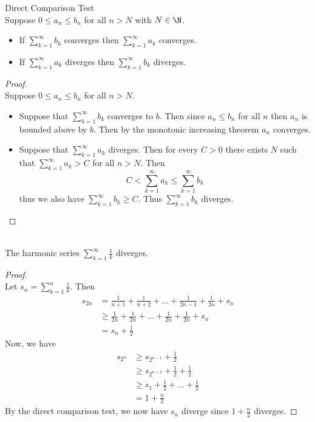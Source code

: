 \documentclass[a4paper]{article}
\begin{document}
\begin{thm}{Direct Comparison Test}{}\\ Suppose $0\leq a_n\leq b_n$ for all $n>N$ with $N\in\N$.
\begin{itemize}
\item If $\sum_{k=1}^\infty b_k$ converges then $\sum_{k=1}^\infty a_k$ converges. 
\item If $\sum_{k=1}^\infty a_k$ diverges then $\sum_{k=1}^\infty b_k$ diverges. 
\end{itemize}
\begin{proof}\\ Suppose $0\leq a_n\leq b_n$ for all $n>N$. 
\begin{itemize}
\item Suppose that $\sum_{k=1}^\infty b_k$ converges to $b$. Then since $a_n\leq b_n$ for all $n$ then $a_n$ is bounded above by $b$. Then by the monotonic increasing theorem $a_n$ converges. 
\item Suppose that $\sum_{k=1}^\infty a_k$ diverges. Then for every $C>0$ there exists $N$ such that $\sum_{k=1}^\infty a_k>C$ for all $n>N$. Then $$C<\sum_{k=1}^\infty a_k\leq\sum_{k=1}^\infty b_k$$ thus we also have $\sum_{k=1}^\infty b_k\geq C$. Thus $\sum_{k=1}^\infty b_k$ diverges. 
\end{itemize}
\end{proof}
\end{thm}

\begin{eg}{}{}\\ The harmonic series $\sum_{k=1}^\infty\frac{1}{k}$ diverges. 
\begin{proof}\\ Let $s_n=\sum_{k=1}^{n}\frac{1}{k}$. Then
\begin{align*}
s_{2n}&=\frac{1}{n+1}+\frac{1}{n+2}+\dots+\frac{1}{2n-1}+\frac{1}{2n}+s_n\\
&\geq\frac{1}{2n}+\frac{1}{2n}+\dots+\frac{1}{2n}+\frac{1}{2n}+s_n\\
&=s_n+\frac{1}{2}
\end{align*}
Now, we have 
\begin{align*}
s_{2^n}&\geq s_{2^{n-1}}+\frac{1}{2}\\
&\geq s_{2^{n-2}}+\frac{1}{2}+\frac{1}{2}\\
&\geq s_1+\frac{1}{2}+\dots+\frac{1}{2}\tag{$n$ times}\\
&=1+\frac{n}{2}
\end{align*}
By the direct comparison test, we now have $s_n$ diverge since $1+\frac{n}{2}$ diverges. 
\end{proof}
\end{eg}
\end{document}
